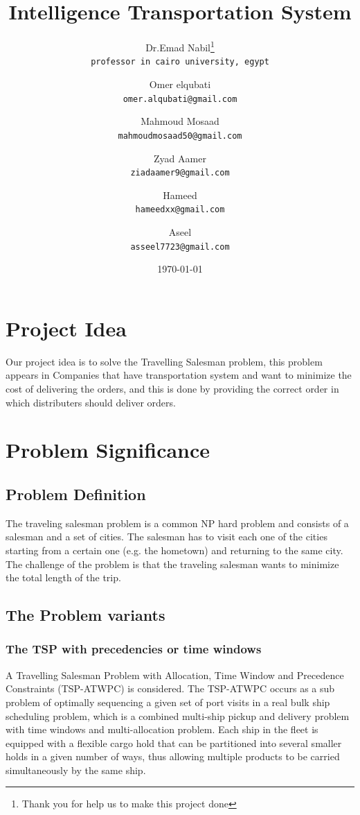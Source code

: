 \documentclass[12pt]{article}
\title{\bf{Intelligence Transportation System}}
\author{
  Dr.Emad Nabil\thanks{Thank you for help us to make this project done}\\
  \texttt{professor in cairo university, egypt}
  \and
  Omer elqubati\\
  \texttt{omer.alqubati@gmail.com}
  \and
  Mahmoud Mosaad\\
  \texttt{mahmoudmosaad50@gmail.com}
  \and
  Zyad Aamer\\
  \texttt{ziadaamer9@gmail.com}
  \and
  Hameed\\
  \texttt{hameedxx@gmail.com}
  \and
  Aseel\\
  \texttt{asseel7723@gmail.com}
}
\date{\today }
\newcommand\blankpage{%
    \null
    \thispagestyle{empty}%
    \addtocounter{page}{-1}%
    \newpage}
\begin{document}
\begin{titlepage}
\clearpage\maketitle
\thispagestyle{empty}
\end{titlepage}

\blankpage
\tableofcontents
\newpage

\section{\sc Project Idea}
Our project idea is to solve the Travelling Salesman problem, this problem appears in Companies that have transportation system and want to minimize the cost of delivering the orders, and this is done by providing the correct order in which distributers should deliver orders.

\section{\sc Problem Significance}

\subsection{ Problem Definition }
The traveling salesman problem is a common NP hard problem and consists of a salesman and a set of cities. The salesman has to visit each one of the cities starting from a certain one (e.g. the hometown) and returning to the same city. The challenge of the problem is that the traveling salesman wants to minimize the total length of the trip.

\subsection{ The Problem variants }

\subsubsection{ The TSP with precedencies or time windows }
A Travelling Salesman Problem with Allocation, Time Window and Precedence Constraints (TSP-ATWPC) is considered. The TSP-ATWPC occurs as a sub problem of optimally sequencing a given set of port visits in a real bulk ship scheduling problem, which is a combined multi-ship pickup and delivery problem with time windows and multi-allocation problem. Each ship in the fleet is equipped with a flexible cargo hold that can be partitioned into several smaller holds in a given number of ways, thus allowing multiple products to be carried simultaneously by the same ship.
\end{document}
